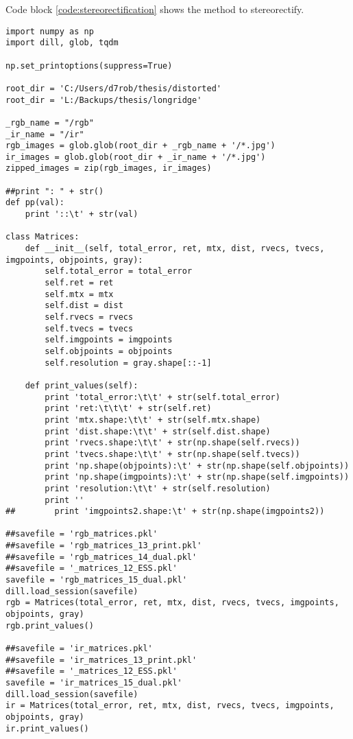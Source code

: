 \begin{appendices}
\begin{lstlisting}
\end{lstlisting}

\newpage
Code block \ref{code:stereorectification} shows the method to stereorectify.

\begin{lstlisting}
import numpy as np
import dill, glob, tqdm

np.set_printoptions(suppress=True)

root_dir = 'C:/Users/d7rob/thesis/distorted'
root_dir = 'L:/Backups/thesis/longridge'

_rgb_name = "/rgb"
_ir_name = "/ir"
rgb_images = glob.glob(root_dir + _rgb_name + '/*.jpg')
ir_images = glob.glob(root_dir + _ir_name + '/*.jpg')
zipped_images = zip(rgb_images, ir_images)

##print ": " + str()
def pp(val):
    print '::\t' + str(val)

class Matrices:
    def __init__(self, total_error, ret, mtx, dist, rvecs, tvecs, imgpoints, objpoints, gray):
        self.total_error = total_error
        self.ret = ret
        self.mtx = mtx
        self.dist = dist
        self.rvecs = rvecs
        self.tvecs = tvecs
        self.imgpoints = imgpoints
        self.objpoints = objpoints
        self.resolution = gray.shape[::-1]

    def print_values(self):
        print 'total_error:\t\t' + str(self.total_error)
        print 'ret:\t\t\t' + str(self.ret)
        print 'mtx.shape:\t\t' + str(self.mtx.shape)
        print 'dist.shape:\t\t' + str(self.dist.shape)
        print 'rvecs.shape:\t\t' + str(np.shape(self.rvecs))
        print 'tvecs.shape:\t\t' + str(np.shape(self.tvecs))
        print 'np.shape(objpoints):\t' + str(np.shape(self.objpoints))
        print 'np.shape(imgpoints):\t' + str(np.shape(self.imgpoints))
        print 'resolution:\t\t' + str(self.resolution)
        print ''
##        print 'imgpoints2.shape:\t' + str(np.shape(imgpoints2))

##savefile = 'rgb_matrices.pkl'
##savefile = 'rgb_matrices_13_print.pkl'
##savefile = 'rgb_matrices_14_dual.pkl'
##savefile = '_matrices_12_ESS.pkl'
savefile = 'rgb_matrices_15_dual.pkl'
dill.load_session(savefile)
rgb = Matrices(total_error, ret, mtx, dist, rvecs, tvecs, imgpoints, objpoints, gray)
rgb.print_values()

##savefile = 'ir_matrices.pkl'
##savefile = 'ir_matrices_13_print.pkl'
##savefile = '_matrices_12_ESS.pkl'
savefile = 'ir_matrices_15_dual.pkl'
dill.load_session(savefile)
ir = Matrices(total_error, ret, mtx, dist, rvecs, tvecs, imgpoints, objpoints, gray)
ir.print_values()


\end{lstlisting}
\end{appendices}
